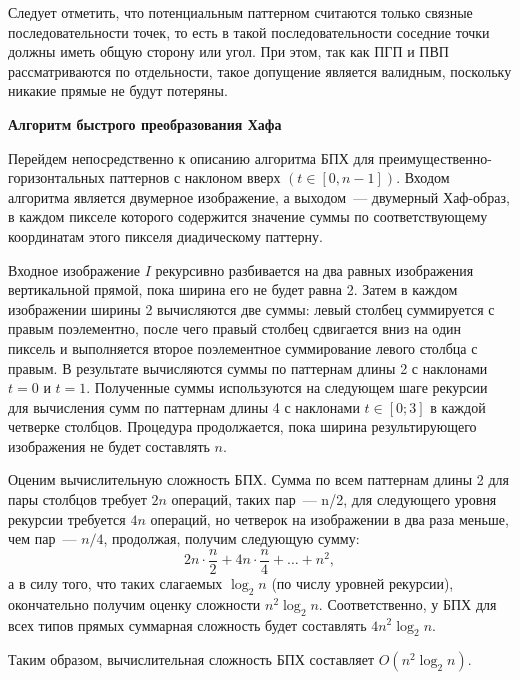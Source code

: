 \documentclass[a4paper,12pt]{article}
\begin{document}
Следует отметить, что потенциальным паттерном считаются только связные последовательности точек, то есть в такой последовательности соседние точки должны иметь общую сторону или угол. При этом, так как ПГП и ПВП рассматриваются по отдельности, такое допущение является валидным, поскольку никакие прямые не будут потеряны.

{\bf Алгоритм быстрого преобразования Хафа}

Перейдем непосредственно к описанию алгоритма БПХ для преимущественно-горизонтальных паттернов с наклоном вверх $(t \in [0, n-1])$. Входом алгоритма является двумерное изображение, а выходом~--- двумерный Хаф-образ, в каждом пикселе которого содержится значение суммы по соответствующему координатам этого пикселя диадическому паттерну.

Входное изображение $I$ рекурсивно разбивается на два равных изображения вертикальной прямой, пока ширина его не будет равна 2. Затем в каждом изображении ширины 2 вычисляются две суммы: левый столбец суммируется с правым поэлементно, после чего правый столбец сдвигается вниз на один пиксель и выполняется второе поэлементное суммирование левого столбца с правым. В результате вычисляются суммы по паттернам длины 2 с наклонами $t = 0$ и $t = 1$. Полученные суммы используются на следующем шаге рекурсии для вычисления сумм по паттернам длины 4 с наклонами $t \in [0; 3]$ в каждой четверке столбцов. Процедура продолжается, пока ширина результирующего изображения не будет составлять $n$.

Оценим вычислительную сложность БПХ. Сумма по всем паттернам длины 2 для пары столбцов требует $2n$ операций, таких пар~--- n/2, для следующего уровня рекурсии требуется $4n$ операций, но четверок на изображении в два раза меньше, чем пар~--- $n/4$, продолжая, получим следующую сумму: \[ 2n \cdot \frac{n}{2} + 4n \cdot \frac{n}{4} + \ldots + n^2, \] а в силу того, что таких слагаемых $\log_2 n$ (по числу уровней рекурсии), окончательно получим оценку сложности $n^2 \log_2 n$. Соответственно, у БПХ для всех типов прямых суммарная сложность будет составлять $4n^2 \log_2 n$.

Таким образом, вычислительная сложность БПХ составляет $O(n^2 \log_2 n)$.
\end{document}
